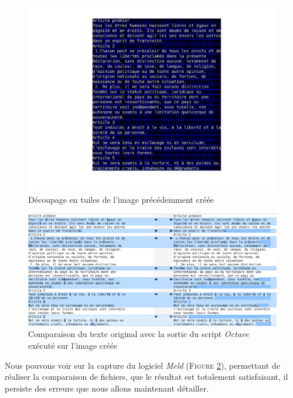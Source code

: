 \documentclass[a4paper,12pt,titlepage]{report}
\newcommand{\octave}{\textit{Octave }}
\begin{document}
	\begin{figure}[ht!]
		\begin{center}
			\includegraphics[scale=0.42]{../illus/tuilesDUDH.png}
		\end{center}
		\vspace{-4em}
		\caption{Découpage en tuiles de l'image précédemment créée}
		\label{tuilesDUDH}
	\end{figure}
	
	\vspace{4em}
	
	\begin{figure}[h!]
		\begin{center}
			\includegraphics[scale=0.42]{../illus/diffDUDH.png}
		\end{center}
		\vspace{-1em}
		\caption{Comparaison du texte original avec la sortie du script \octave exécuté sur l'image créée}
		\label{diffDUDH}
	\end{figure}
	
	Nous pouvons voir sur la capture du logiciel \textit{Meld} (\textsc{Figure \ref{diffDUDH}}), permettant de réaliser la comparaison de fichiers, que le résultat est totalement satisfaisant, il persiste des erreurs que nous allons maintenant détailler.
	
\end{document}
